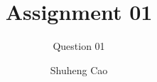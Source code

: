 \documentclass[11pt, oneside]{article}
\title{Assignment 01}
\author{Question 01}
\date{ Shuheng Cao}
\begin{document}
\thispagestyle{empty}
\def\layersep{2.5cm}
\nopagecolor




						
		






\end{document}

